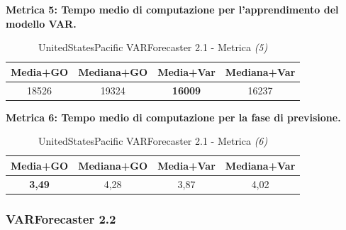 \documentclass[12pt,a4paper,oneside,openright]{book}
\begin{document}
\medskip 
\textbf{Metrica 5: Tempo medio di computazione per l'apprendimento del modello VAR.}

\medskip

\begin{table}[H]
\centering
\begin{tabular}[H]{|c|c|c|c|}
\hline
\textbf{Media+GO} & \textbf{Mediana+GO} & \textbf{Media+Var} & \textbf{Mediana+Var} \\
\hline
18526 & 19324 & \textbf{16009} & 16237\\
\hline
\end{tabular}
\caption{UnitedStatesPacific VARForecaster 2.1 - Metrica \textit{(5)}}
\end{table} 

\medskip 
\textbf{Metrica 6: Tempo medio di computazione per la fase di previsione.}

\medskip


\begin{table}[H]
\centering
\begin{tabular}[H]{|c|c|c|c|}
\hline
\textbf{Media+GO} & \textbf{Mediana+GO} & \textbf{Media+Var} & \textbf{Mediana+Var} \\
\hline
\textbf{3,49} & 4,28 & 3,87 & 4,02 \\
\hline
\end{tabular}
\caption{UnitedStatesPacific VARForecaster 2.1 - Metrica \textit{(6)}}
\end{table} 

\newpage

\subsubsection{VARForecaster 2.2}
\end{document}

